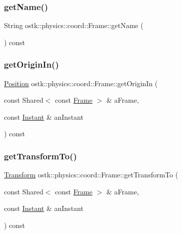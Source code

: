 \mbox{\label{classostk_1_1physics_1_1coord_1_1_frame_a47aca195a73e14198f6d615c8988ce6e}} 
\subsubsection{\texorpdfstring{get\+Name()}{getName()}}
{\footnotesize\ttfamily String ostk\+::physics\+::coord\+::\+Frame\+::get\+Name (\begin{DoxyParamCaption}{ }\end{DoxyParamCaption}) const}

\mbox{\label{classostk_1_1physics_1_1coord_1_1_frame_a9f0544fd284d2ff4bca6a54dc8835bff}} 
\subsubsection{\texorpdfstring{get\+Origin\+In()}{getOriginIn()}}
{\footnotesize\ttfamily \hyperlink{classostk_1_1physics_1_1coord_1_1_position}{Position} ostk\+::physics\+::coord\+::\+Frame\+::get\+Origin\+In (\begin{DoxyParamCaption}\item[{const Shared$<$ const \hyperlink{classostk_1_1physics_1_1coord_1_1_frame}{Frame} $>$ \&}]{a\+Frame,  }\item[{const \hyperlink{classostk_1_1physics_1_1time_1_1_instant}{Instant} \&}]{an\+Instant }\end{DoxyParamCaption}) const}

\mbox{\label{classostk_1_1physics_1_1coord_1_1_frame_aa6f51c81724f36644ad8343a1124c264}} 
\subsubsection{\texorpdfstring{get\+Transform\+To()}{getTransformTo()}}
{\footnotesize\ttfamily \hyperlink{classostk_1_1physics_1_1coord_1_1_transform}{Transform} ostk\+::physics\+::coord\+::\+Frame\+::get\+Transform\+To (\begin{DoxyParamCaption}\item[{const Shared$<$ const \hyperlink{classostk_1_1physics_1_1coord_1_1_frame}{Frame} $>$ \&}]{a\+Frame,  }\item[{const \hyperlink{classostk_1_1physics_1_1time_1_1_instant}{Instant} \&}]{an\+Instant }\end{DoxyParamCaption}) const}

